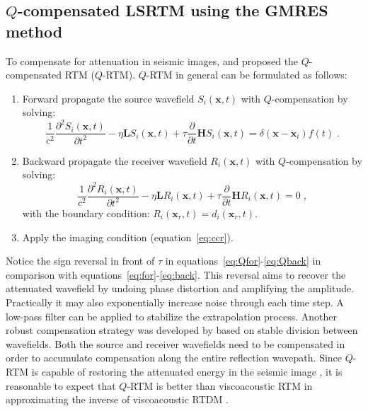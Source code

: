 \subsection{$Q$-compensated LSRTM using the GMRES method}

To compensate for attenuation in seismic images, \cite{zhu14b} and \cite{me15a} proposed the $Q$-compensated RTM ($Q$-RTM). $Q$-RTM in general can be formulated as follows:
\begin{enumerate}[leftmargin=*]
  \item Forward propagate the source wavefield $S_i(\mathbf{x},t)$ with $Q$-compensation by solving:
  \begin{equation}
  \label{eq:Qfor}
    \frac{1}{c^2}\frac{\partial^2 S_i(\mathbf{x},t)}{\partial t^2} - \eta \mathbf{L} S_i(\mathbf{x},t) + \tau \frac{\partial}{\partial t}\mathbf{H} S_i(\mathbf{x},t) = \delta(\mathbf{x}-\mathbf{x}_i) f(t) \; .
  \end{equation}
  \item Backward propagate the receiver wavefield $R_i(\mathbf{x},t)$ with $Q$-compensation by solving:
  \begin{equation}
  \label{eq:Qback}
    \frac{1}{c^2}\frac{\partial^2 R_i(\mathbf{x},t)}{\partial t^2} - \eta \mathbf{L} R_i(\mathbf{x},t) + \tau \frac{\partial}{\partial t} \mathbf{H} R_i(\mathbf{x},t) = 0 \;,
  \end{equation}
  with the boundary condition: $R_i(\mathbf{x}_r,t) = d_i(\mathbf{x}_r,t)$.
  \item Apply the imaging condition (equation~\ref{eq:ccr}).
\end{enumerate}
Notice the sign reversal in front of $\tau$ in equations~\ref{eq:Qfor}-\ref{eq:Qback} in comparison with equations~\ref{eq:for}-\ref{eq:back}. This reversal aims to recover the attenuated wavefield by undoing phase distortion and amplifying the amplitude. Practically it may also exponentially increase noise through each time step. A low-pass filter can be applied to stabilize the extrapolation process. Another robust compensation strategy was developed by \cite{me15c} based on stable division between wavefields. Both the source and receiver wavefields need to be compensated in order to accumulate compensation along the entire reflection wavepath. Since $Q$-RTM is capable of restoring the attenuated energy in the seismic image \cite[]{zhu14b,me15a}, it is reasonable to expect that $Q$-RTM is better than viscoacoustic RTM in approximating the inverse of viscoacoustic RTDM .

